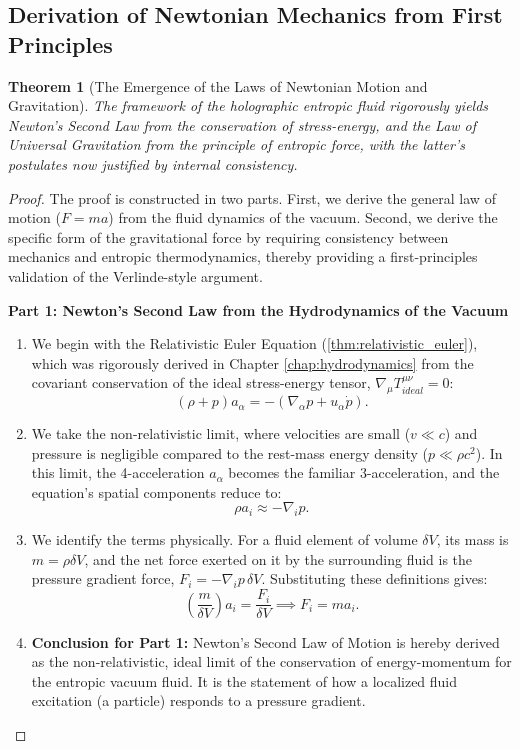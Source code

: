 \documentclass[11pt, letterpaper]{report}
\theoremstyle{plain} %
\newtheorem{theorem}{Theorem}[chapter]
\theoremstyle{definition} %
\theoremstyle{remark} %
\begin{document}
\subsection{Derivation of Newtonian Mechanics from First Principles}
\label{subsec:newtonian_first_principles}

\begin{theorem}[The Emergence of the Laws of Newtonian Motion and Gravitation]
\label{thm:derive_newton_full}
The framework of the holographic entropic fluid rigorously yields Newton's Second Law from the conservation of stress-energy, and the Law of Universal Gravitation from the principle of entropic force, with the latter's postulates now justified by internal consistency.
\end{theorem}
\begin{proof}
The proof is constructed in two parts. First, we derive the general law of motion ($F=ma$) from the fluid dynamics of the vacuum. Second, we derive the specific form of the gravitational force by requiring consistency between mechanics and entropic thermodynamics, thereby providing a first-principles validation of the Verlinde-style argument.

\textbf{Part 1: Newton's Second Law from the Hydrodynamics of the Vacuum}
\begin{enumerate}
    \item We begin with the Relativistic Euler Equation (\cref{thm:relativistic_euler}), which was rigorously derived in Chapter \ref{chap:hydrodynamics} from the covariant conservation of the ideal stress-energy tensor, $\nabla_\mu T^{\mu\nu}_{ideal} = 0$:
    \begin{equation}
        (\rho+p)a_\alpha = -(\nabla_\alpha p + u_\alpha \dot{p}).
    \end{equation}
    \item We take the non-relativistic limit, where velocities are small ($v \ll c$) and pressure is negligible compared to the rest-mass energy density ($p \ll \rho c^2$). In this limit, the 4-acceleration $a_\alpha$ becomes the familiar 3-acceleration, and the equation's spatial components reduce to:
    \begin{equation}
        \rho a_i \approx -\nabla_i p.
    \end{equation}
    \item We identify the terms physically. For a fluid element of volume $\delta V$, its mass is $m = \rho \delta V$, and the net force exerted on it by the surrounding fluid is the pressure gradient force, $F_i = -\nabla_i p \, \delta V$. Substituting these definitions gives:
    $$ \left(\frac{m}{\delta V}\right) a_i = \frac{F_i}{\delta V} \implies F_i = m a_i. $$
    \item \textbf{Conclusion for Part 1:} Newton's Second Law of Motion is hereby derived as the non-relativistic, ideal limit of the conservation of energy-momentum for the entropic vacuum fluid. It is the statement of how a localized fluid excitation (a particle) responds to a pressure gradient.
\end{enumerate}


\end{proof}
\end{document}
